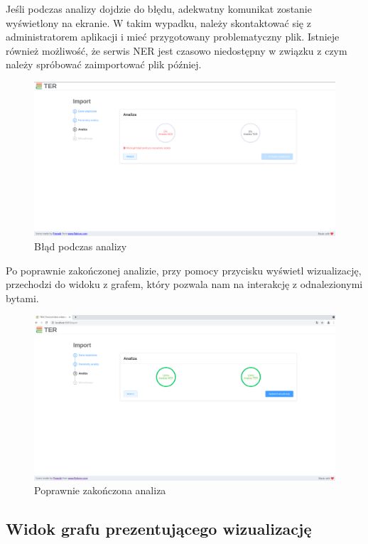 \documentclass[12pt, a4paper]{article}
\begin{document}
Jeśli podczas analizy dojdzie do błędu, adekwatny komunikat zostanie wyświetlony na ekranie. W takim wypadku, należy skontaktować się z administratorem aplikacji i mieć przygotowany problematyczny plik. Istnieje również możliwość, że serwis NER jest czasowo niedostępny w związku z czym należy spróbować zaimportować plik później.

\begin{figure}[H]
    \centering
    \includegraphics[width=\linewidth]{images/analiza-error.png}
    \caption{Błąd podczas analizy}
\end{figure}

Po poprawnie zakończonej analizie, przy pomocy przycisku wyświetl wizualizację, przechodzi do widoku z grafem, który pozwala nam na interakcję z odnalezionymi bytami.

\begin{figure}[H]
    \centering
    \includegraphics[width=\linewidth]{images/analiza-success.png}
    \caption{Poprawnie zakończona analiza}
\end{figure}


\subsection{Widok grafu prezentującego wizualizację}\label{section:graph}





\end{document}
